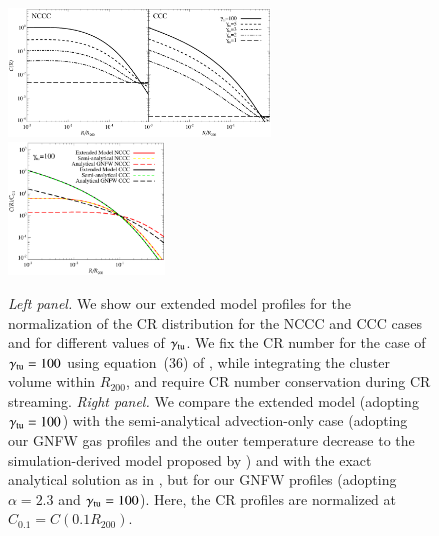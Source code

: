 \documentclass[useAMS,usenatbib]{mn2e}
\begin{document}
\begin{figure} 
\centering
\includegraphics[width=0.62\textwidth]{figures/CR_profiles_FinalModel.eps}
\includegraphics[width=0.37\textwidth]{figures/CR_profiles_FinalModelvsREX_norm0.1.eps}
\caption{\emph{Left panel.} We show our extended model profiles for the
  normalization of the CR distribution for the NCCC and CCC cases and for
  different values of $\gamma_{{\mathrm{tu}}}$. We fix the CR number for the case of
  $\gamma_{{\mathrm{tu}}}=100$ using equation~(36) of \protect\cite{2011A&A...527A..99E},
  while integrating the cluster volume within $R_{200}$, and require CR number
  conservation during CR streaming. \emph{Right panel.} We compare the
  extended model (adopting $\gamma_{{\mathrm{tu}}}=100$) with the semi-analytical
  advection-only case (adopting our GNFW gas profiles and the outer temperature
  decrease to the simulation-derived model proposed by
  \protect\citealp{2010MNRAS.409..449P}) and with the exact analytical solution as in
  \protect\citet{2011A&A...527A..99E}, but for our GNFW profiles (adopting $\alpha=2.3$
  and $\gamma_{{\mathrm{tu}}}=100$). Here, the CR profiles are normalized at
  $C_{0.1}=C(0.1R_{200})$.}
\label{fig:CRFinalModel}
\end{figure}
\end{document}
